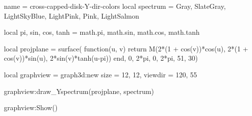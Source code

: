 \documentclass{standalone}
\begin{document}
\begin{luadraw}{name = cross-capped-disk-Y-dir-colors}
local spectrum = {Gray, SlateGray, LightSkyBlue, LightPink, Pink, LightSalmon}

local pi, sin, cos, tanh = math.pi, math.sin, math.cos, math.tanh

local projplane = surface(
  function(u, v)
    return M(2*(1 + cos(v))*cos(u), 2*(1 + cos(v))*sin(u), 2*sin(v)*tanh(u-pi))
  end,
  0, 2*pi, 0,  2*pi,
  {51, 30})

local graphview = graph3d:new{
  size    = {12, 12},
  viewdir = {120, 55}
}

graphview:draw_Yspectrum(projplane, spectrum)

graphview:Show()
\end{luadraw}
\end{document}
